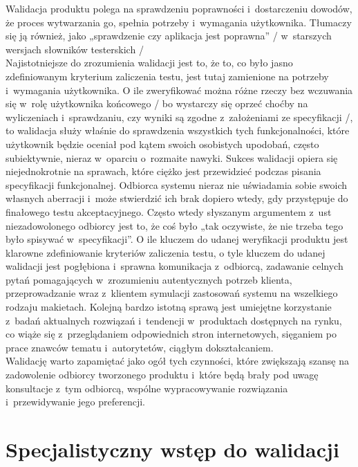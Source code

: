 \documentclass{xmgr}
\begin{document}
\indent Walidacja produktu polega na sprawdzeniu poprawności i~dostarczeniu dowodów,  że proces wytwarzania go, spełnia potrzeby i~wymagania użytkownika. Tłumaczy się ją również, jako „sprawdzenie czy aplikacja jest poprawna” / w~starszych wersjach słowników testerskich / \cite{ALTKOM}
\\
\indent Najistotniejsze do zrozumienia walidacji jest to, że to, co było jasno zdefiniowanym kryterium zaliczenia testu, jest tutaj zamienione na potrzeby i~wymagania użytkownika. O ile zweryfikować można różne rzeczy bez wczuwania się w~rolę użytkownika końcowego / bo wystarczy się oprzeć choćby na wyliczeniach i~sprawdzaniu, czy wyniki są zgodne z~założeniami ze specyfikacji /, to walidacja służy właśnie do sprawdzenia wszystkich tych funkcjonalności, które użytkownik będzie oceniał pod kątem swoich osobistych upodobań, często subiektywnie, nieraz w~oparciu o~rozmaite nawyki.
Sukces walidacji opiera się niejednokrotnie na sprawach, które ciężko jest przewidzieć podczas pisania specyfikacji funkcjonalnej. Odbiorca systemu nieraz nie uświadamia sobie swoich własnych aberracji i~może stwierdzić ich brak dopiero wtedy, gdy przystępuje do finałowego testu akceptacyjnego. Często wtedy słyszanym argumentem z~ust niezadowolonego odbiorcy jest to, że coś było „tak oczywiste, że nie trzeba tego było spisywać w~specyfikacji”.
O ile kluczem do udanej weryfikacji produktu jest klarowne zdefiniowanie kryteriów zaliczenia testu, o tyle kluczem do udanej walidacji jest pogłębiona i~sprawna komunikacja z~odbiorcą, zadawanie celnych pytań pomagających w~zrozumieniu autentycznych potrzeb klienta, przeprowadzanie wraz z~klientem symulacji zastosowań systemu na wszelkiego rodzaju makietach. Kolejną bardzo istotną sprawą jest umiejętne korzystanie z~badań aktualnych rozwiązań i~tendencji w~produktach dostępnych na rynku, co wiąże się z~przeglądaniem odpowiednich stron internetowych, sięganiem po prace znawców tematu i~autorytetów, ciągłym dokształcaniem.
\\
\indent Walidację warto zapamiętać jako ogół tych czynności, które zwiększają szansę na zadowolenie odbiorcy tworzonego produktu i~które będą brały pod uwagę konsultacje z~tym odbiorcą, wspólne wypracowywanie rozwiązania i~przewidywanie jego preferencji.\cite{ALTKOM}

\section{Specjalistyczny wstęp do walidacji}
\end{document}
